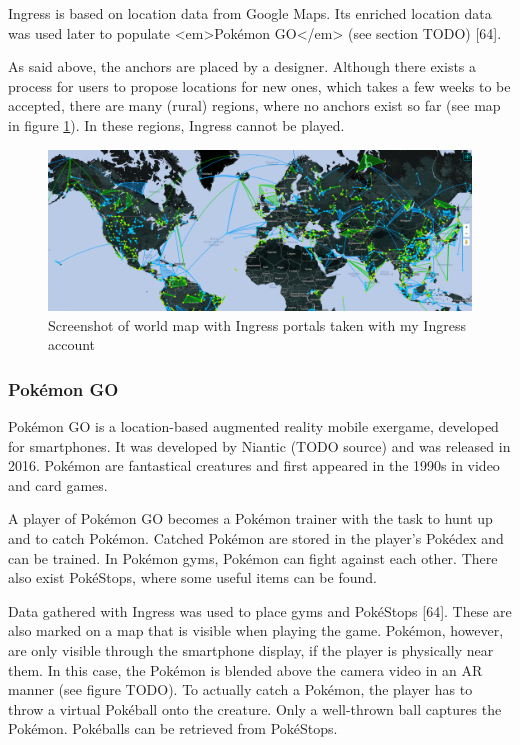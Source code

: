 Ingress is based on location data from Google Maps. Its enriched location data was used later to populate <em>Pokémon GO</em> (see section TODO) [64].

As said above, the anchors are placed by a designer. Although there exists a process for users to propose locations for new ones, which takes a few weeks to be accepted, there are many (rural) regions, where no anchors exist so far (see map in figure \ref{fig:ingressMap}). In these regions, Ingress cannot be played.

\begin{figure}[bth]
  \centering
        \includegraphics[width=.95\linewidth]{gfx/ingress_map}
        \caption{Screenshot of world map with Ingress portals taken with my Ingress account}
        \label{fig:ingressMap}
\end{figure}

\subsubsection{Pokémon GO}
Pokémon GO is a location-based augmented reality mobile exergame, developed for smartphones. It was developed by Niantic (TODO source) and was released in 2016. Pokémon are fantastical creatures and first appeared in the 1990s in video and card games.

A player of Pokémon GO becomes a Pokémon trainer with the task to hunt up and to catch Pokémon. Catched Pokémon are stored in the player’s Pokédex and can be trained. In Pokémon gyms, Pokémon can fight against each other. There also exist PokéStops, where some useful items can be found.

Data gathered with Ingress was used to place gyms and PokéStops [64]. These are also marked on a map that is visible when playing the game. Pokémon, however, are only visible through the smartphone display, if the player is physically near them. In this case, the Pokémon is blended above the camera video in an AR manner (see figure TODO).
To actually catch a Pokémon, the player has to throw a virtual Pokéball onto the creature. Only a well-thrown ball captures the Pokémon. Pokéballs can be retrieved from PokéStops.


